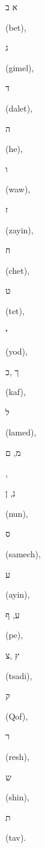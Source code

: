 \documentclass[a4paper,11pt]{article}
\begin{document}
\begin{hebrew} א ב‎ \end{hebrew} (bet), \begin{hebrew} ג‎ \end{hebrew} (gimel),
\begin{hebrew} ד‎ \end{hebrew} (dalet), \begin{hebrew} ה‎ \end{hebrew} (he),
\begin{hebrew} ו‎ \end{hebrew} (waw), \begin{hebrew} ז \end{hebrew} (zayin),
\begin{hebrew} ח \end{hebrew} (chet), \begin{hebrew} ט‎ \end{hebrew} (tet),
\begin{hebrew} י \end{hebrew} (yod), \begin{hebrew} כ‎, ך \end{hebrew} (kaf),
\begin{hebrew} ל‎ \end{hebrew} (lamed), \begin{hebrew} מ, ם \end{hebrew},
\begin{hebrew} נ, ן‎ \end{hebrew} (nun), \begin{hebrew} ס‎ \end{hebrew}
(samech), \begin{hebrew} ע \end{hebrew} (ayin),
\begin{hebrew} ע, ף‎ \end{hebrew} (pe), \begin{hebrew} צ‎, ץ \end{hebrew}
(tsadi), \begin{hebrew} ק \end{hebrew} (Qof), \begin{hebrew} ר \end{hebrew}
(resh), \begin{hebrew} ש \end{hebrew} (shin), \begin{hebrew} ת \end{hebrew} (tav).




\end{document}
